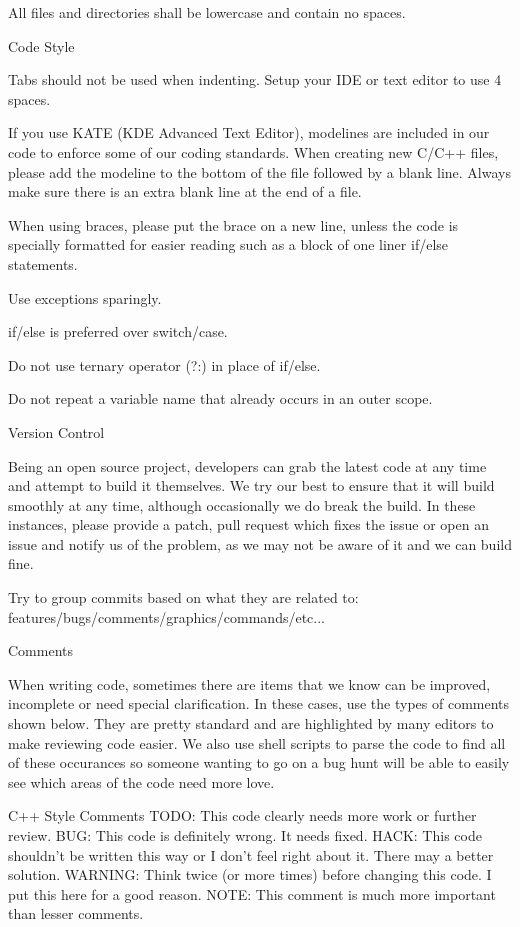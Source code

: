 \documentclass[a4paper]{report}
\begin{document}
{All files and directories shall be lowercase and contain no spaces.

Code Style
~~~~~~~~~~

Tabs should not be used when indenting. Setup your IDE or text editor to use 4 spaces.

If you use KATE (KDE Advanced Text Editor), modelines are included in our code to enforce 
some of our coding standards. When creating new C/C++ files, please add
the modeline to the bottom of the file followed by a blank line. Always make sure there
is an extra blank line at the end of a file.

When using braces, please put the brace on a new line, unless the code is specially formatted
for easier reading such as a block of one liner if/else statements.

Use exceptions sparingly.

if/else is preferred over switch/case.

Do not use ternary operator (?:) in place of if/else.

Do not repeat a variable name that already occurs in an outer scope.

Version Control 
~~~~~~~~~~~~~~~

Being an open source project, developers can grab the latest code at any time
and attempt to build it themselves. We try our best to ensure that it will build smoothly
at any time, although occasionally we do break the build. In these instances,
please provide a patch, pull request which fixes the issue or open an issue and
notify us of the problem, as we may not be aware of it and we can build fine.

Try to group commits based on what they are related to: features/bugs/comments/graphics/commands/etc...

Comments
~~~~~~~~

When writing code, sometimes there are items that we know can be improved,
incomplete or need special clarification. In these cases, use the types of
comments shown below. They are pretty standard and are highlighted by many editors to
make reviewing code easier. We also use shell scripts to parse the code to find
all of these occurances so someone wanting to go on a bug hunt will be able to
easily see which areas of the code need more love.

    C++ Style Comments
    TODO: This code clearly needs more work or further review.
    BUG: This code is definitely wrong. It needs fixed.
    HACK: This code shouldn't be written this way or I don't feel right about it. There may a better solution.
    WARNING: Think twice (or more times) before changing this code. I put this here for a good reason.
    NOTE: This comment is much more important than lesser comments.

}
\end{document}
